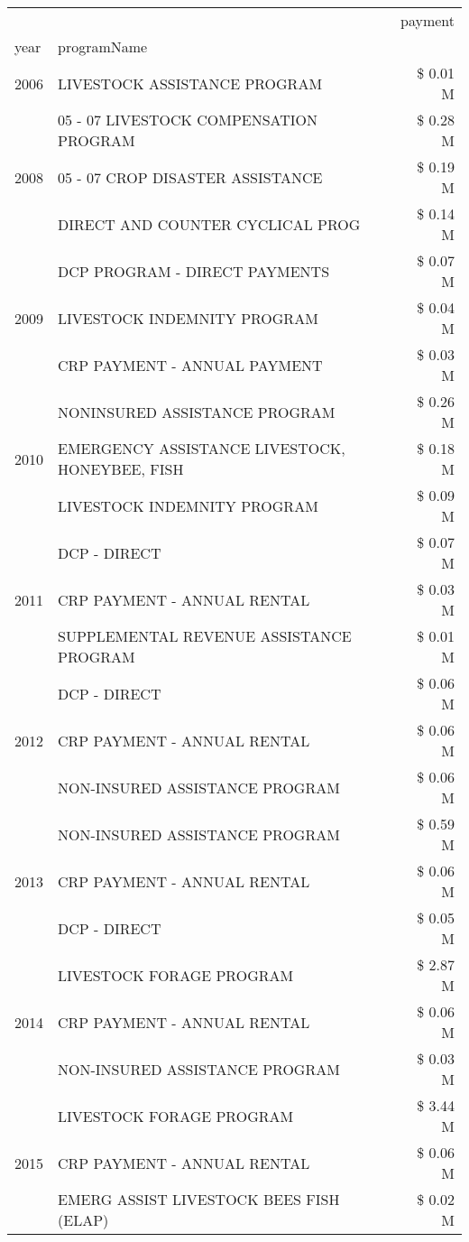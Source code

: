 \begin{tabular}{llr}
\toprule
 &  & payment \\
year & programName &  \\
\midrule
2006 & LIVESTOCK ASSISTANCE PROGRAM & \$ 0.01 M \\
\cline{1-3}
\multirow[t]{3}{*}{2008} & 05 - 07 LIVESTOCK COMPENSATION PROGRAM & \$ 0.28 M \\
 & 05 - 07 CROP DISASTER ASSISTANCE & \$ 0.19 M \\
 & DIRECT AND COUNTER CYCLICAL PROG & \$ 0.14 M \\
\cline{1-3}
\multirow[t]{3}{*}{2009} & DCP PROGRAM - DIRECT PAYMENTS & \$ 0.07 M \\
 & LIVESTOCK INDEMNITY PROGRAM & \$ 0.04 M \\
 & CRP PAYMENT - ANNUAL PAYMENT & \$ 0.03 M \\
\cline{1-3}
\multirow[t]{3}{*}{2010} & NONINSURED ASSISTANCE PROGRAM & \$ 0.26 M \\
 & EMERGENCY ASSISTANCE LIVESTOCK, HONEYBEE, FISH & \$ 0.18 M \\
 & LIVESTOCK INDEMNITY PROGRAM & \$ 0.09 M \\
\cline{1-3}
\multirow[t]{3}{*}{2011} & DCP - DIRECT & \$ 0.07 M \\
 & CRP PAYMENT - ANNUAL RENTAL & \$ 0.03 M \\
 & SUPPLEMENTAL REVENUE ASSISTANCE PROGRAM & \$ 0.01 M \\
\cline{1-3}
\multirow[t]{3}{*}{2012} & DCP - DIRECT & \$ 0.06 M \\
 & CRP PAYMENT - ANNUAL RENTAL & \$ 0.06 M \\
 & NON-INSURED ASSISTANCE PROGRAM & \$ 0.06 M \\
\cline{1-3}
\multirow[t]{3}{*}{2013} & NON-INSURED ASSISTANCE PROGRAM & \$ 0.59 M \\
 & CRP PAYMENT - ANNUAL RENTAL & \$ 0.06 M \\
 & DCP - DIRECT & \$ 0.05 M \\
\cline{1-3}
\multirow[t]{3}{*}{2014} & LIVESTOCK FORAGE PROGRAM & \$ 2.87 M \\
 & CRP PAYMENT - ANNUAL RENTAL & \$ 0.06 M \\
 & NON-INSURED ASSISTANCE PROGRAM & \$ 0.03 M \\
\cline{1-3}
\multirow[t]{3}{*}{2015} & LIVESTOCK FORAGE PROGRAM & \$ 3.44 M \\
 & CRP PAYMENT - ANNUAL RENTAL & \$ 0.06 M \\
 & EMERG ASSIST LIVESTOCK BEES FISH (ELAP) & \$ 0.02 M \\

\end{tabular}
